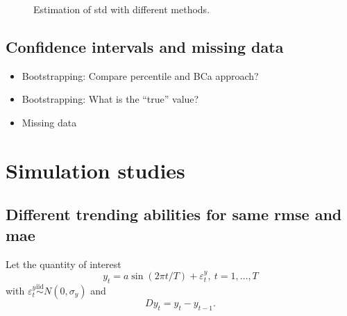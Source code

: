 \documentclass[oneside]{article}
\theoremstyle{plain}%
\theoremstyle{definition}
\newcommand{\ydiff}{D y}
\begin{document}
\begin{figure}
  \caption{Estimation of std with different methods.}
  \label{fig:estimation std}
\end{figure}


\subsection{Confidence intervals and missing data}


\begin{itemize}
  \item Bootstrapping: Compare percentile and BCa approach?
  \item Bootstrapping: What is the \enquote{true} value?
  \item Missing data
\end{itemize}


\section{Simulation studies}

\subsection{Different trending abilities for same rmse and mae} \label{sec:simulation_rmse_mae}

Let the quantity of interest 
\begin{equation}\label{eq: simulation}
  y_t = a \sin(2 \pi t / T) + \varepsilon_t^y, \ t = 1, \dots, T
\end{equation}
with $\varepsilon_t^y \stackrel{\text{iid}}{\sim} N(0, \sigma_y)$ and 
\begin{equation}
  \ydiff_t = y_t - y_{t-1}.
\end{equation}
\end{document}
